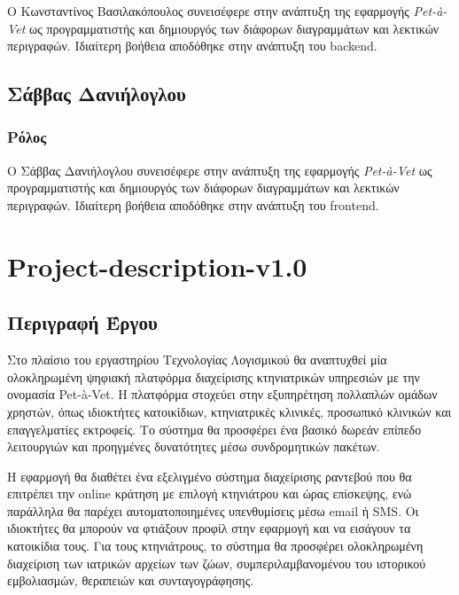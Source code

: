 \documentclass[12pt,a4paper,twoside]{book}
\begin{document}
Ο Κωνσταντίνος Βασιλακόπουλος συνεισέφερε στην ανάπτυξη της εφαρμογής \textit{Pet-à-Vet} ως προγραμματιστής και δημιουργός των διάφορων διαγραμμάτων και λεκτικών περιγραφών. Ιδιαίτερη βοήθεια αποδόθηκε στην ανάπτυξη του backend. %

\section{Σάββας Δανιήλογλου}

\subsection{Ρόλος}

Ο Σάββας Δανιήλογλου συνεισέφερε στην ανάπτυξη της εφαρμογής \textit{Pet-à-Vet} ως προγραμματιστής και δημιουργός των διάφορων διαγραμμάτων και λεκτικών περιγραφών. Ιδιαίτερη βοήθεια αποδόθηκε στην ανάπτυξη του frontend. %

\chapter{Project-description-v1.0}

\section{Περιγραφή Έργου}

Στο πλαίσιο του εργαστηρίου Τεχνολογίας Λογισμικού θα αναπτυχθεί μία ολοκληρωμένη ψηφιακή πλατφόρμα διαχείρισης κτηνιατρικών υπηρεσιών με την ονομασία Pet-à-Vet. Η πλατφόρμα στοχεύει στην εξυπηρέτηση πολλαπλών ομάδων χρηστών, όπως ιδιοκτήτες κατοικίδιων, κτηνιατρικές κλινικές, προσωπικό κλινικών και επαγγελματίες εκτροφείς. Το σύστημα θα προσφέρει ένα βασικό δωρεάν επίπεδο λειτουργιών και προηγμένες δυνατότητες μέσω συνδρομητικών πακέτων. %

Η εφαρμογή θα διαθέτει ένα εξελιγμένο σύστημα διαχείρισης ραντεβού που θα επιτρέπει την online κράτηση με επιλογή κτηνιάτρου και ώρας επίσκεψης, ενώ παράλληλα θα παρέχει αυτοματοποιημένες υπενθυμίσεις μέσω email ή SMS. Οι ιδιοκτήτες θα μπορούν να φτιάξουν προφίλ στην εφαρμογή και να εισάγουν τα κατοικίδια τους. Για τους κτηνιάτρους, το σύστημα θα προσφέρει ολοκληρωμένη διαχείριση των ιατρικών αρχείων των ζώων, συμπεριλαμβανομένου του ιστορικού εμβολιασμών, θεραπειών και συνταγογράφησης.%
\end{document}
